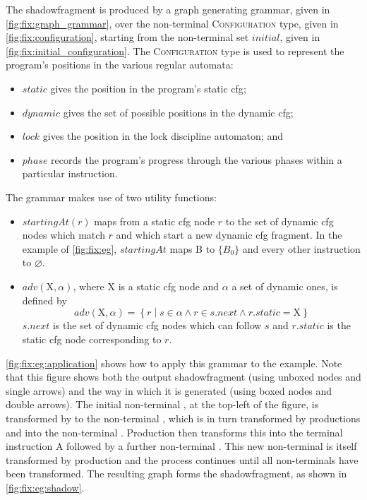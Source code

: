 \noindent
The \gls{shadowfragment} is produced by a graph generating grammar,
given in \autoref{fig:fix:graph_grammar}, over the non-terminal
\textsc{Configuration} type, given in \autoref{fig:fix:configuration},
starting from the non-terminal set $\mathit{initial}$, given in
\autoref{fig:fix:initial_configuration}.  The \textsc{Configuration}
type is used to represent the program's positions in the various
regular automata:
\begin{itemize}
\item $\mathit{static}$ gives the position in the program's
  \gls{static cfg};
\item $\mathit{dynamic}$ gives the set of possible positions in the
  \gls{dynamic cfg};
\item $\mathit{lock}$ gives the position in the lock discipline
  automaton; and
\item $\mathit{phase}$ records the program's progress through the
  various phases within a particular instruction.
\end{itemize}
The grammar makes use of two utility functions:
\begin{itemize}
\item $\mathit{startingAt}(r)$ maps from a \gls{static cfg} node $r$
  to the set of \gls{dynamic cfg} nodes which match $r$ and which
  start a new \gls{dynamic cfg} fragment.  In the example of
  \autoref{fig:fix:eg}, $\mathit{startingAt}$ maps B to $\{B_0\}$ and
  every other instruction to $\varnothing$.
\item $\mathit{adv}(\mathrm{X}, \alpha)$, where $\mathrm{X}$ is a
  \gls{static cfg} node and $\alpha$ a set of dynamic ones, is defined
  by
  \begin{displaymath}
    \mathit{adv}(\mathrm{X}, \alpha) = \left\{r \middle| s \in \alpha \wedge r \in s.\mathit{next} \wedge r.\mathit{static} = \mathrm{X}\right\}
  \end{displaymath}
  $s.\mathit{next}$ is the set of \gls{dynamic cfg} nodes which can
  follow $s$ and $r.\mathit{static}$ is the \gls{static cfg} node
  corresponding to $r$.
\end{itemize}

\noindent
\autoref{fig:fix:eg:application} shows how to apply this grammar to
the example.  Note that this figure shows both the output
\gls{shadowfragment} (using unboxed nodes and single arrows) and the
way in which it is generated (using boxed nodes and double arrows).
The initial non-terminal , at the top-left of the figure, is
transformed by  to the non-terminal , which is in turn
transformed by productions  and  into
the non-terminal .  Production  then transforms this
into the terminal instruction A followed by a further non-terminal
.  This
new non-terminal is itself transformed by production 
and the process continues until all non-terminals have been
transformed.  The resulting graph forms the \gls{shadowfragment}, as
shown in \autoref{fig:fix:eg:shadow}.

